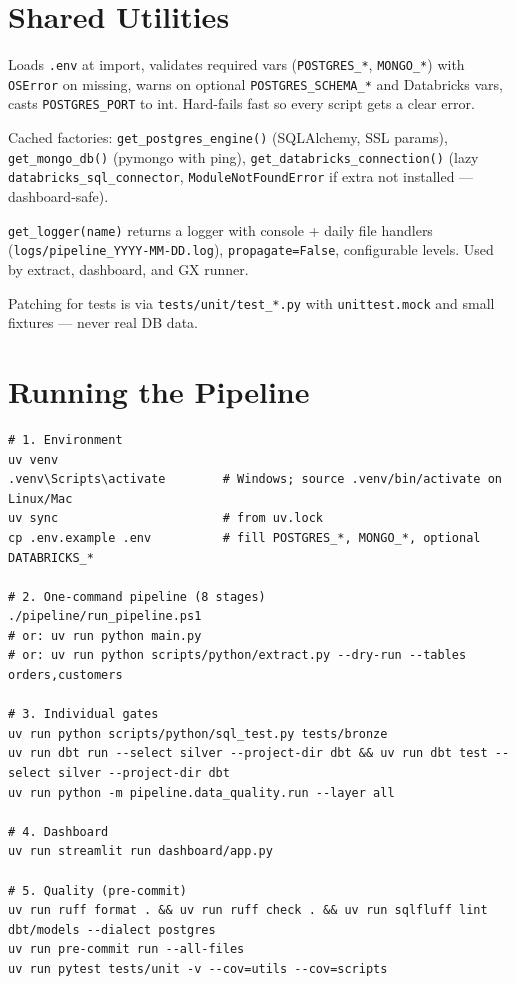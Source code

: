 \documentclass[11pt,a4paper]{article}
\begin{document}
\section{Shared Utilities}

\begin{description}[leftmargin=1.2em,style=nextline]
  \item[\texttt{utils/engine.py}] Loads \texttt{.env} at import, validates required vars (\texttt{POSTGRES\_*}, \texttt{MONGO\_*}) with \texttt{OSError} on missing, warns on optional \texttt{POSTGRES\_SCHEMA\_*} and Databricks vars, casts \texttt{POSTGRES\_PORT} to int. Hard-fails fast so every script gets a clear error.
  \item[\texttt{utils/connection.py}] Cached factories: \texttt{get\_postgres\_engine()} (SQLAlchemy, SSL params), \texttt{get\_mongo\_db()} (pymongo with ping), \texttt{get\_databricks\_connection()} (lazy \texttt{databricks\_sql\_connector}, \texttt{ModuleNotFoundError} if extra not installed — dashboard-safe).
  \item[\texttt{utils/logger.py}] \texttt{get\_logger(name)} returns a logger with console + daily file handlers (\texttt{logs/pipeline\_YYYY-MM-DD.log}), \texttt{propagate=False}, configurable levels. Used by extract, dashboard, and GX runner.
\end{description}

Patching for tests is via \texttt{tests/unit/test\_*.py} with \texttt{unittest.mock} and small fixtures — never real DB data.

\section{Running the Pipeline}

\begin{lstlisting}[style=bash,caption={Local (Windows) — mirrors README ``Run it''.}]
# 1. Environment
uv venv
.venv\Scripts\activate        # Windows; source .venv/bin/activate on Linux/Mac
uv sync                       # from uv.lock
cp .env.example .env          # fill POSTGRES_*, MONGO_*, optional DATABRICKS_*

# 2. One-command pipeline (8 stages)
./pipeline/run_pipeline.ps1
# or: uv run python main.py
# or: uv run python scripts/python/extract.py --dry-run --tables orders,customers

# 3. Individual gates
uv run python scripts/python/sql_test.py tests/bronze
uv run dbt run --select silver --project-dir dbt && uv run dbt test --select silver --project-dir dbt
uv run python -m pipeline.data_quality.run --layer all

# 4. Dashboard
uv run streamlit run dashboard/app.py

# 5. Quality (pre-commit)
uv run ruff format . && uv run ruff check . && uv run sqlfluff lint dbt/models --dialect postgres
uv run pre-commit run --all-files
uv run pytest tests/unit -v --cov=utils --cov=scripts
\end{lstlisting}
\end{document}
